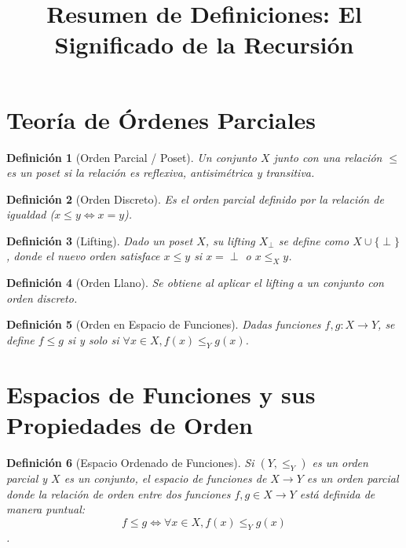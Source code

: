 \documentclass{article}
\title{Resumen de Definiciones: El Significado de la Recursión}
\author{}
\date{}
\newtheorem{definition}{Definición}
\begin{document}
\maketitle

\section{Teoría de Órdenes Parciales}

\begin{definition}[Orden Parcial / Poset]
Un conjunto $X$ junto con una relación $\le$ es un \textit{poset} si la relación es reflexiva, antisimétrica y transitiva.
\end{definition}

\begin{definition}[Orden Discreto]
Es el orden parcial definido por la relación de igualdad ($x \le y \iff x = y$).
\end{definition}

\begin{definition}[Lifting]
Dado un poset $X$, su lifting $X_{\perp}$ se define como $X \cup \{\perp\}$, donde el nuevo orden satisface $x \le y$ si $x = \perp$ o $x \le_X y$.
\end{definition}

\begin{definition}[Orden Llano]
Se obtiene al aplicar el \textit{lifting} a un conjunto con orden discreto.
\end{definition}

\begin{definition}[Orden en Espacio de Funciones]
Dadas funciones $f, g: X \to Y$, se define $f \le g$ si y solo si $\forall x \in X, f(x) \le_Y g(x)$.
\end{definition}

\section{Espacios de Funciones y sus Propiedades de Orden}

\begin{definition}[Espacio Ordenado de Funciones]
Si $(Y, \le_Y)$ es un orden parcial y $X$ es un conjunto, el espacio de funciones de $X \to Y$ es un orden parcial donde la relación de orden entre dos funciones $f, g \in X \to Y$ está definida de manera puntual:
\begin{equation}
    f \le g \iff \forall x \in X, f(x) \le_Y g(x)
\end{equation}
.
\end{definition}
\end{document}
